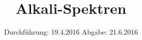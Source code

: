 

\subject{V605  Korrektur}
\title{Alkali-Spektren}
\date{
  Durchführung: 19.4.2016
  \hspace{3em}
  Abgabe: 21.6.2016
}



\maketitle
\thispagestyle{empty}
\tableofcontents
\newpage








\printbibliography


